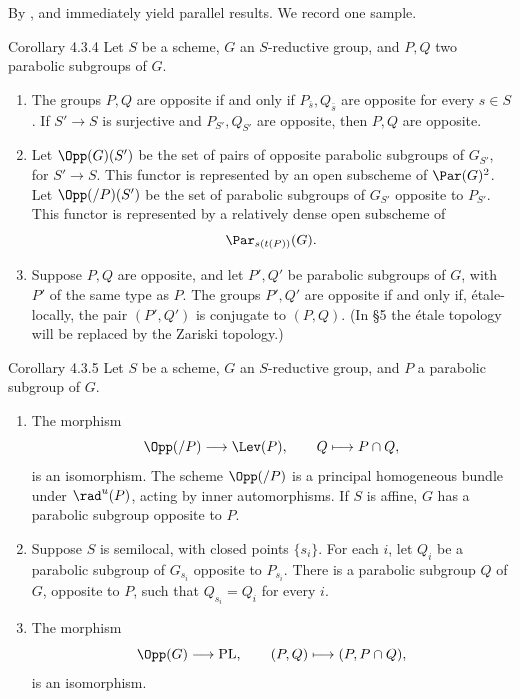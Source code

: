 By \textup{},  and  immediately yield
parallel results.  We record one sample.

\begin{sgastatement}{Corollary 4.3.4}
Let \(S\) be a scheme, \(G\) an \(S\)-reductive group, and \(P,Q\) two
parabolic subgroups of \(G\).
\begin{enumerate}[label=\textup{(\roman*)}]
\item The groups \(P,Q\) are opposite if and only if
\(P_{\bar s},Q_{\bar s}\) are opposite for every \(s\in S\).  If
\(S'\to S\) is surjective and \(P_{S'},Q_{S'}\) are opposite, then
\(P,Q\) are opposite.
\item Let \(\Opp(G)(S')\) be the set of pairs of opposite parabolic
subgroups of \(G_{S'}\), for \(S'\to S\).  This functor is represented
by an open subscheme of \(\Par(G)^2\).  Let \(\Opp(/P)(S')\) be the set
of parabolic subgroups of \(G_{S'}\) opposite to \(P_{S'}\).  This
functor is represented by a relatively dense open subscheme of
\[
 \Par_{s(t(P))}(G).
\]
\item Suppose \(P,Q\) are opposite, and let \(P',Q'\) be parabolic
subgroups of \(G\), with \(P'\) of the same type as \(P\).  The groups
\(P',Q'\) are opposite if and only if, étale-locally, the pair
\((P',Q')\) is conjugate to \((P,Q)\).
\textup{(In §5 the étale topology will be replaced by the Zariski
topology.)}
\end{enumerate}
\end{sgastatement}

\begin{sgastatement}{Corollary 4.3.5}
Let \(S\) be a scheme, \(G\) an \(S\)-reductive group, and \(P\) a
parabolic subgroup of \(G\).
\begin{enumerate}[label=\textup{(\roman*)}]
\item The morphism
\[
 \Opp(/P)\longrightarrow\Lev(P),\qquad Q\longmapsto P\cap Q,
\]
is an isomorphism.  The scheme \(\Opp(/P)\) is a principal homogeneous
bundle under \(\rad^u(P)\), acting by inner automorphisms.  If \(S\) is
affine, \(G\) has a parabolic subgroup opposite to \(P\).
\item Suppose \(S\) is semilocal, with closed points \(\{s_i\}\).  For
each \(i\), let \(Q_i\) be a parabolic subgroup of \(G_{s_i}\) opposite
to \(P_{s_i}\).  There is a parabolic subgroup \(Q\) of \(G\), opposite
to \(P\), such that \(Q_{s_i}=Q_i\) for every \(i\).
\item The morphism
\[
 \Opp(G)\longrightarrow\mathrm{PL},\qquad
 (P,Q)\longmapsto(P,P\cap Q),
\]
is an isomorphism.
\end{enumerate}
\end{sgastatement}

